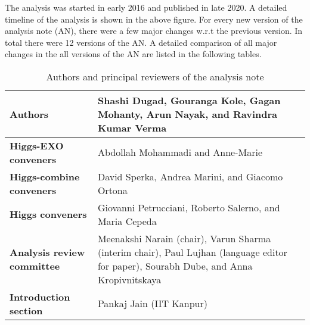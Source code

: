 
The analysis was started in early 2016 and published in late 2020. A
detailed timeline of the analysis is shown in the above figure. 
For every new version of the analysis note (AN), there were a few major 
changes w.r.t the previous version. In total there were 12 versions of
the AN. A detailed comparison of all major changes in the all versions
of the AN are listed in the following tables.

\begin{table}
\centering
\caption*{Authors and principal reviewers of the analysis note}
\begin{adjustbox}{max width=\textwidth}
\begin{tabular}{p{8cm}|p{8cm}}
\hline
{\textbf{Authors}} & {Shashi Dugad, Gouranga Kole, Gagan Mohanty, Arun Nayak, and Ravindra Kumar Verma}\\
\hline
{\textbf{Higgs-EXO conveners}} & {Abdollah Mohammadi and Anne-Marie}\\
\hline
{\textbf{Higgs-combine conveners}}     & {David Sperka, Andrea Marini, and Giacomo Ortona}\\
\hline
{\textbf{Higgs conveners}}     & { Giovanni Petrucciani, Roberto Salerno, and Maria Cepeda}\\
\hline
{\textbf{Analysis review committee}}     & { Meenakshi Narain (chair), Varun Sharma (interim chair), Paul Lujhan (language editor for paper), Sourabh Dube, and Anna Kropivnitskaya}\\
\hline
{\textbf{Introduction section}} & {Pankaj Jain (IIT Kanpur)}\\
\hline
\end{tabular}
\end{adjustbox}
\end{table}

